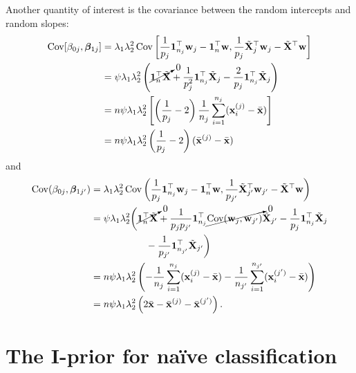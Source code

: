 Another quantity of interest is the covariance between the random intercepts and random slopes:
\begin{align*}
  \operatorname{Cov}[\beta_{0j}, \boldsymbol{\beta}_{1j}] 
  &= \lambda_1\lambda_2^2  \operatorname{Cov}\left[ \frac{1}{p_{j}} {\mathbf 1}_{n_j}^\top {\mathbf w}_{j} - {\mathbf 1}_n^\top {\mathbf w}, \frac{1}{p_{j}} \tilde{{\mathbf X}}_{j}^\top {\mathbf w}_{j} - \tilde{{\mathbf X}}^\top {\mathbf w}   \right] \\
  &= \psi\lambda_1\lambda_2^2  \left( \cancelto{0}{{\mathbf 1}_{n}^\top \tilde{{\mathbf X}}} + \frac{1}{p_{j}^2} {\mathbf 1}_{n_j}^\top \tilde{{\mathbf X}}_j  - \frac{2}{p_{j}} {\mathbf 1}_{n_{j}}^\top \tilde{{\mathbf X}}_{j} \right) \\
  &= n\psi\lambda_1\lambda_2^2  \left[  \left(\frac{1}{p_j} - 2 \right) \frac{1}{n_{j}} \sum_{i=1}^{n_j}({\mathbf x}_i^{(j)} - \bar {{\mathbf x}})  \right] \\
  &= n\psi\lambda_1\lambda_2^2 \left(\frac{1}{p_j} - 2 \right) ( \bar{{\mathbf x}}^{(j)}   -\bar {{\mathbf x}}  ) 
\end{align*}
and
\begin{align*}
  \operatorname{Cov}(\beta_{0j}, \boldsymbol{\beta}_{1j'})
  &= \lambda_1\lambda_2^2  \operatorname{Cov}\left( \frac{1}{p_{j}} {\mathbf 1}_{n_j}^\top {\mathbf w}_{j} - {\mathbf 1}_n^\top {\mathbf w}, \frac{1}{p_{j'}} \tilde{{\mathbf X}}_{j'}^\top {\mathbf w}_{j'} - \tilde{{\mathbf X}}^\top {\mathbf w}   \right) \\
  &= \psi\lambda_1\lambda_2^2  \bigg( \cancelto{0}{{\mathbf 1}_{n}^\top \tilde{{\mathbf X}}} + \frac{1}{p_{j}p_{j'}} {\mathbf 1}_{n_j}^\top \cancelto{0}{\operatorname{Cov}({\mathbf w}_j,{\mathbf w}_{j'})} \tilde{{\mathbf X}}_{j'} - \frac{1}{p_{j}} {\mathbf 1}_{n_j}^\top \tilde{{\mathbf X}}_j  \\
  &\hspace{2cm} - \frac{1}{p_{j'}} {\mathbf 1}_{n_{j'}}^\top \tilde{{\mathbf X}}_{j'} \bigg) \\
  &= n\psi\lambda_1\lambda_2^2  \left(  - \frac{1}{n_{j}} \sum_{i=1}^{n_j}({\mathbf x}_i^{(j)} - \bar {{\mathbf x}})  - \frac{1}{n_{j'}} \sum_{i=1}^{n_{j'}}({\mathbf x}_i^{(j')} - \bar {{\mathbf x}}) \right) \\
  &= n\psi\lambda_1\lambda_2^2  \left(  2\bar {{\mathbf x}} -  \bar{{\mathbf x}}^{(j)}  -  \bar {{\mathbf x}}^{(j')}  \right).
\end{align*}


\section{The I-prior for naïve classification}

